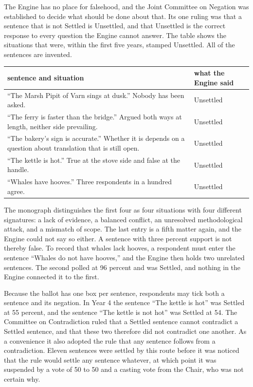\documentclass[11pt]{article}
\begin{document}
The Engine has no place for falsehood, and the Joint Committee on Negation was established to decide what should be done about that. Its one ruling was that a sentence that is not Settled is Unsettled, and that Unsettled is the correct response to every question the Engine cannot answer. The table shows the situations that were, within the first five years, stamped Unsettled. All of the sentences are invented.

\begin{center}
\small
\begin{tabularx}{\textwidth}{@{}X X@{}}
\toprule
sentence and situation & what the Engine said\\
\midrule
``The Marsh Pipit of Varn sings at dusk.'' Nobody has been asked. & Unsettled\\
``The ferry is faster than the bridge.'' Argued both ways at length, neither side prevailing. & Unsettled\\
``The bakery's sign is accurate.'' Whether it is depends on a question about translation that is still open. & Unsettled\\
``The kettle is hot.'' True at the stove side and false at the handle. & Unsettled\\
``Whales have hooves.'' Three respondents in a hundred agree. & Unsettled\\
\bottomrule
\end{tabularx}
\end{center}

The monograph distinguishes the first four as four situations with four different signatures: a lack of evidence, a balanced conflict, an unresolved methodological attack, and a mismatch of scope. The last entry is a fifth matter again, and the Engine could not say so either. A sentence with three percent support is not thereby false. To record that whales lack hooves, a respondent must enter the sentence ``Whales do not have hooves,'' and the Engine then holds two unrelated sentences. The second polled at 96 percent and was Settled, and nothing in the Engine connected it to the first.

Because the ballot has one box per sentence, respondents may tick both a sentence and its negation. In Year 4 the sentence ``The kettle is hot'' was Settled at 55 percent, and the sentence ``The kettle is not hot'' was Settled at 54. The Committee on Contradiction ruled that a Settled sentence cannot contradict a Settled sentence, and that these two therefore did not contradict one another. As a convenience it also adopted the rule that any sentence follows from a contradiction. Eleven sentences were settled by this route before it was noticed that the rule would settle any sentence whatever, at which point it was suspended by a vote of 50 to 50 and a casting vote from the Chair, who was not certain why.
\end{document}
